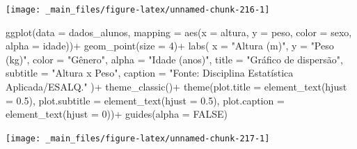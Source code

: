 \documentclass[
  brazilian,
]{book}
\newenvironment{Shaded}{\begin{snugshade}}{\end{snugshade}}
\newcommand{\AttributeTok}[1]{\textcolor[rgb]{0.77,0.63,0.00}{#1}}
\newcommand{\ConstantTok}[1]{\textcolor[rgb]{0.00,0.00,0.00}{#1}}
\newcommand{\DecValTok}[1]{\textcolor[rgb]{0.00,0.00,0.81}{#1}}
\newcommand{\FloatTok}[1]{\textcolor[rgb]{0.00,0.00,0.81}{#1}}
\newcommand{\FunctionTok}[1]{\textcolor[rgb]{0.00,0.00,0.00}{#1}}
\newcommand{\NormalTok}[1]{#1}
\newcommand{\SpecialCharTok}[1]{\textcolor[rgb]{0.00,0.00,0.00}{#1}}
\newcommand{\StringTok}[1]{\textcolor[rgb]{0.31,0.60,0.02}{#1}}
\begin{document}
\begin{center}\texttt{[image: \_main\_files/figure-latex/unnamed-chunk-216-1]} \end{center}

\begin{Shaded}
\begin{Highlighting}[]
\FunctionTok{ggplot}\NormalTok{(}\AttributeTok{data =}\NormalTok{ dados\_alunos,}
       \AttributeTok{mapping =} \FunctionTok{aes}\NormalTok{(}\AttributeTok{x =}\NormalTok{ altura,}
                     \AttributeTok{y =}\NormalTok{ peso,}
                     \AttributeTok{color =}\NormalTok{ sexo,}
                     \AttributeTok{alpha =}\NormalTok{ idade))}\SpecialCharTok{+}
  \FunctionTok{geom\_point}\NormalTok{(}\AttributeTok{size =} \DecValTok{4}\NormalTok{)}\SpecialCharTok{+}
  \FunctionTok{labs}\NormalTok{(}
    \AttributeTok{x =} \StringTok{"Altura (m)"}\NormalTok{,}
    \AttributeTok{y =} \StringTok{"Peso (kg)"}\NormalTok{,}
    \AttributeTok{color =} \StringTok{"Gênero"}\NormalTok{,}
    \AttributeTok{alpha =} \StringTok{"Idade (anos)"}\NormalTok{,}
    \AttributeTok{title =} \StringTok{"Gráfico de dispersão"}\NormalTok{,}
    \AttributeTok{subtitle =} \StringTok{"Altura x Peso"}\NormalTok{,}
    \AttributeTok{caption =} \StringTok{"Fonte: Disciplina Estatística Aplicada/ESALQ."}
\NormalTok{  )}\SpecialCharTok{+}
  \FunctionTok{theme\_classic}\NormalTok{()}\SpecialCharTok{+}
  \FunctionTok{theme}\NormalTok{(}\AttributeTok{plot.title =} \FunctionTok{element\_text}\NormalTok{(}\AttributeTok{hjust =} \FloatTok{0.5}\NormalTok{),}
        \AttributeTok{plot.subtitle =} \FunctionTok{element\_text}\NormalTok{(}\AttributeTok{hjust =} \FloatTok{0.5}\NormalTok{),}
        \AttributeTok{plot.caption =} \FunctionTok{element\_text}\NormalTok{(}\AttributeTok{hjust =} \DecValTok{0}\NormalTok{))}\SpecialCharTok{+}
  \FunctionTok{guides}\NormalTok{(}\AttributeTok{alpha =} \ConstantTok{FALSE}\NormalTok{)}
\end{Highlighting}
\end{Shaded}

\begin{center}\texttt{[image: \_main\_files/figure-latex/unnamed-chunk-217-1]} \end{center}
\end{document}
